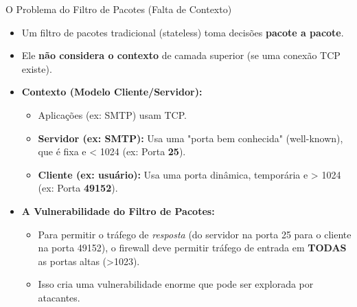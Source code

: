 \begin{frame}{O Problema do Filtro de Pacotes (Falta de Contexto)}
    \begin{itemize}
        \item Um filtro de pacotes tradicional (stateless) toma decisões \textbf{pacote a pacote}.
        \item Ele \textbf{não considera o contexto} de camada superior (se uma conexão TCP existe).

        \item \textbf{Contexto (Modelo Cliente/Servidor):}
              \begin{itemize}
                  \item Aplicações (ex: SMTP) usam TCP.
                  \item \textbf{Servidor (ex: SMTP):} Usa uma "porta bem conhecida" (well-known), que é fixa e < 1024 (ex: Porta \textbf{25}).
                  \item \textbf{Cliente (ex: usuário):} Usa uma porta dinâmica, temporária e > 1024 (ex: Porta \textbf{49152}).
              \end{itemize}

        \item \textbf{A Vulnerabilidade do Filtro de Pacotes:}
              \begin{itemize}
                  \item Para permitir o tráfego de \textit{resposta} (do servidor na porta 25 para o cliente na porta 49152), o firewall deve permitir tráfego de entrada em \textbf{TODAS} as portas altas (>1023).
                  \item Isso cria uma vulnerabilidade enorme que pode ser explorada por atacantes.
              \end{itemize}
    \end{itemize}
\end{frame}

